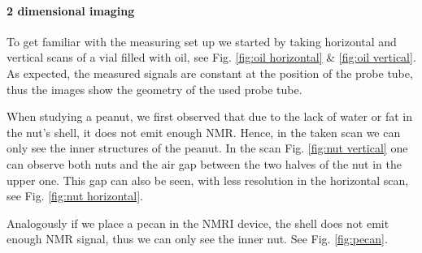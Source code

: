 \paragraph{2 dimensional imaging}
To get familiar with the measuring set up we started by taking horizontal and vertical scans of a vial filled with oil, see Fig. \ref{fig:oil horizontal} \& \ref{fig:oil vertical}. As expected, the measured signals are constant at the position of the probe tube, thus the images show the geometry of the used probe tube. 

When studying a peanut, we first observed that due to the lack of water or fat in the nut's shell, it does not emit enough NMR. Hence, in the taken scan we can only see the inner structures of the peanut. In the scan Fig. \ref{fig:nut vertical} one can observe both nuts and the air gap between the two halves of the nut in the upper one. This gap can also be seen, with less resolution in the horizontal scan, see Fig. \ref{fig:nut horizontal}.

Analogously if we place a pecan in the NMRI device, the shell does not emit enough NMR signal, thus we can only see the inner nut. See Fig. \ref{fig:pecan}. 


